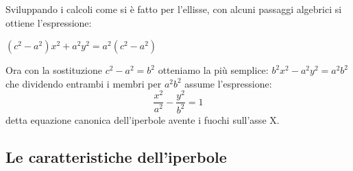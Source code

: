 Sviluppando i calcoli come si è fatto per l'ellisse, con alcuni passaggi 
algebrici si ottiene l'espressione:

$\left( c^{2} -a^{2}\right) x^{2}+a^{2}y^{2}=a^{2}\left(c^{2}-a^{2}\right)$

Ora con la sostituzione $ c^{2}-a^{2}=b^{2} $ 
otteniamo la più semplice: $b^{2}x^{2}-a^{2}y^{2}=a^{2}b^{2}$  
che dividendo entrambi i membri per $a^{2}b^{2}$ assume l'espressione:
\begin{equation}
\dfrac{x^{2}}{a^{2}}-\dfrac{y^{2}}{b^{2}}=1
\end{equation}
detta equazione canonica dell'iperbole avente i fuochi sull'asse X.

\subsection{Le caratteristiche dell'iperbole}
\label{subsec:iperbole_caratteristiche}

